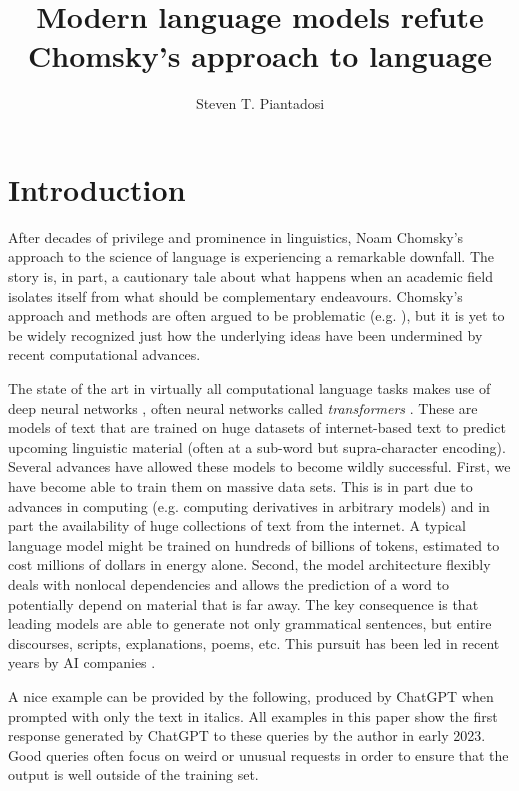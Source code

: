 \documentclass[output=paper,colorlinks,citecolor=brown
]{langscibook}
\author{Steven T. Piantadosi\orcid{}\affiliation{UC Berkeley \& Helen Wills Neuroscience Institute} }
\title{Modern language models refute Chomsky's approach to language} %
\begin{document}
\maketitle
\label{chap-16_piantadosi}

\section{Introduction}

After decades of privilege and prominence in linguistics, Noam Chomsky's approach to the science of language is experiencing a remarkable downfall. The  story is, in part, a cautionary tale about what happens when an academic field isolates itself from what should be complementary endeavours. Chomsky's approach and methods are often argued to be problematic (e.g. \citealt{harris1993linguistics,pullum1989formal,behme2012potpourri,postal2012two,behme2014galilean}), but it is yet to be widely recognized just how the underlying ideas have been undermined by recent computational advances.

The state of the art in virtually all computational language tasks makes use of deep neural networks \citep{lecun2015deep}, often neural networks called \textit{transformers} \citep{vaswani2017attention,brown2020language,bommasani2021opportunities}. These are models of text that are trained on huge datasets of internet-based text to predict upcoming linguistic material (often at a sub-word but supra-character encoding). Several advances have allowed these models to become wildly successful. First, we have become able to train them on massive data sets. This is in part due to advances in computing (e.g. computing derivatives in arbitrary models) and in part the availability of huge collections of text from the internet. A typical language model might be trained on hundreds of billions of tokens, estimated to cost millions of dollars in energy alone. Second, the model architecture flexibly deals with nonlocal dependencies and allows the prediction of a word to potentially depend on material that is far away. The key consequence is that leading models are able to generate not only grammatical sentences, but entire discourses, scripts, explanations, poems, etc. This pursuit has been led in recent years by AI companies \citep{ahmed2023growing}.

A nice example can be provided by the following, produced by ChatGPT when prompted with only the text in italics. All examples in this paper show the first response generated by ChatGPT to these queries by the author in early 2023. Good queries often focus on weird or unusual requests in order to ensure that the output is well outside of the training set.
\end{document}
